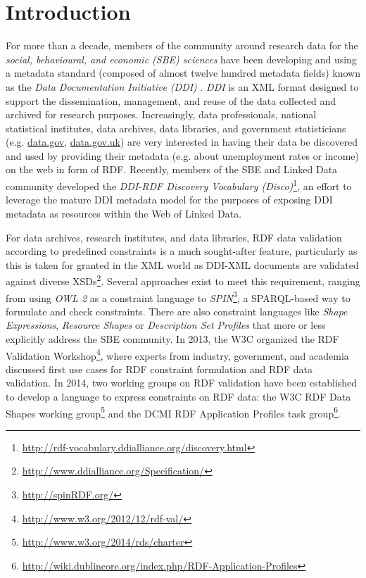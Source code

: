 \documentclass{llncs}
\newcommand{\tb}[1]{\todo[size=\small, color=green!40]{\textbf{Thomas:} #1}}
\begin{document}
\section{Introduction}


For more than a decade, members of the community around research data for the \emph{social, behavioural, and economic (SBE) sciences} have been developing and using a
metadata standard (composed of almost twelve hundred metadata fields) known as the \emph{Data Documentation Initiative (DDI)} \cite{Vardigan2008}.
\emph{DDI} is an XML format designed to support the dissemination, management,
and reuse of the data collected and archived for research purposes.  
Increasingly, data professionals, national statistical institutes, data archives, data libraries, and government statisticians (e.g. \url{data.gov}, \url{data.gov.uk})
are very interested in having their data be discovered and used by providing their metadata (e.g. about unemployment rates or income) on the web in form of RDF.
Recently, members of the SBE and Linked Data community developed the \emph{DDI-RDF Discovery Vocabulary (Disco)}\footnote{\url{http://rdf-vocabulary.ddialliance.org/discovery.html}}, 
an effort to leverage the mature DDI metadata model for the purposes of exposing DDI metadata as resources within the Web of Linked Data. 

For data archives, research institutes, and data libraries,
RDF data validation according to predefined constraints is a much sought-after feature, 
particularly as this is taken for granted in the XML world as DDI-XML documents are validated against diverse XSDs\footnote{\label{fnt:DDI-XSDs}\url{http://www.ddialliance.org/Specification/}}.
Several approaches exist to meet this requirement, ranging from using \emph{OWL 2} as a constraint language to \emph{SPIN}\footnote{\url{http://spinRDF.org/}}, a SPARQL-based way to formulate and check constraints. 
There are also constraint languages like \emph{Shape Expressions}, \emph{Resource Shapes} or \emph{Description Set Profiles} that more or less explicitly address the SBE community.
In 2013, the W3C organized the RDF Validation Workshop\footnote{\url{http://www.w3.org/2012/12/rdf-val/}}, 
where experts from industry, government, and academia discussed first use cases for RDF constraint formulation and RDF data validation.
In 2014, two working groups on RDF validation have been established to develop a language to express constraints on RDF data: 
the W3C RDF Data Shapes working group\footnote{\url{http://www.w3.org/2014/rds/charter}} and the DCMI RDF Application Profiles task group\footnote{\url{http://wiki.dublincore.org/index.php/RDF-Application-Profiles}}. 
\end{document}
